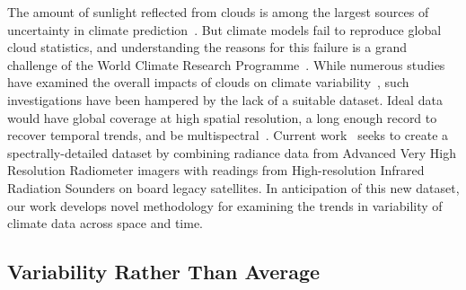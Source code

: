 \documentclass[letterpaper]{article} %
\newcommand{\citep}{\cite}
\begin{document}
The amount of sunlight reflected from clouds is among the largest
sources of uncertainty in climate
prediction~\citep{BoucherRandall2013}. But climate models fail to
reproduce global cloud statistics, and understanding the reasons for
this failure is a grand challenge of the World Climate Research
Programme~\citep{BonyStevens2015}.
While numerous
studies have examined the overall impacts of clouds on climate
variability~\citep{MyersMechoso2018,GrisePolvani2013,BenderRamanathan2012},
such investigations have been hampered by the lack of a suitable
dataset. Ideal data would have global coverage at high spatial
resolution, a long enough record to recover temporal trends, and be
multispectral~\citep{WielickiYoung2013}. 
Current work~\cite{StatenKahn2016,SchreierKahn2010,KahnFishbein2007} seeks to create a
spectrally-detailed dataset by %
combining radiance data from Advanced Very High Resolution Radiometer
imagers with readings from High-resolution 
Infrared Radiation Sounders on board legacy
satellites. 
In anticipation of this new dataset, our work develops novel methodology
for examining the trends in variability of climate data across space
and time.

\subsection{Variability Rather Than Average}
\label{sec:vari-rath-than}
\end{document}
